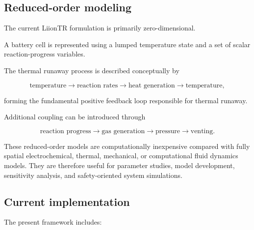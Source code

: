 \subsection{Reduced-order modeling}

The current LiionTR formulation is primarily zero-dimensional.

A battery cell is represented using a lumped temperature state and a set
of scalar reaction-progress variables.

The thermal runaway process is described conceptually by

\begin{equation}
    \text{temperature}
    \rightarrow
    \text{reaction rates}
    \rightarrow
    \text{heat generation}
    \rightarrow
    \text{temperature},
\end{equation}

forming the fundamental positive feedback loop responsible for thermal
runaway.

Additional coupling can be introduced through

\begin{equation}
    \text{reaction progress}
    \rightarrow
    \text{gas generation}
    \rightarrow
    \text{pressure}
    \rightarrow
    \text{venting}.
\end{equation}

These reduced-order models are computationally inexpensive compared with
fully spatial electrochemical, thermal, mechanical, or computational
fluid dynamics models. They are therefore useful for parameter studies,
model development, sensitivity analysis, and safety-oriented system
simulations.


\subsection{Current implementation}

The present framework includes:

